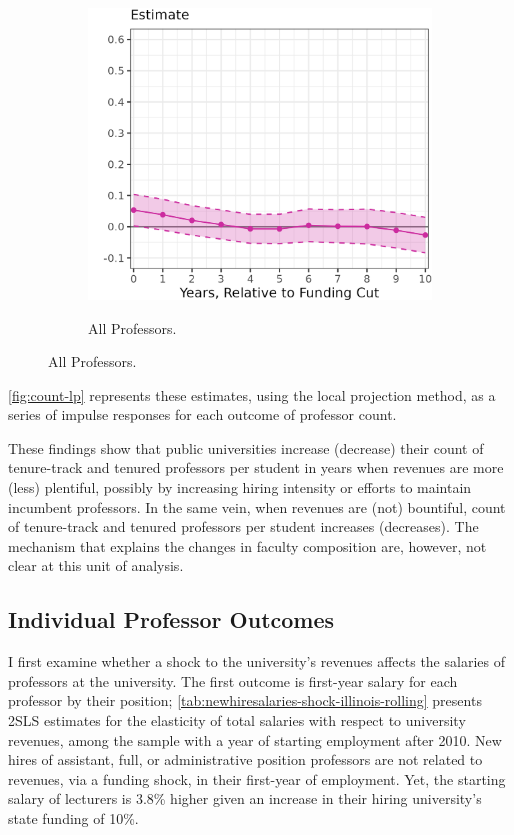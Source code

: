 \begin{figure}[h!]
\begin{subfigure}[b]{0.495\textwidth}
        \centering
        \caption{All Professors.}
        \includegraphics[width=\textwidth]{figures/all-count-lp.png}
        \label{fig:all-count-lp}
    \end{subfigure}
    \label{fig:count-lp}
\end{figure}
\autoref{fig:count-lp} represents these estimates, using the local projection method, as a series of impulse responses for each outcome of professor count.

These findings show that public universities increase (decrease) their count of tenure-track and tenured professors per student in years when revenues are more (less) plentiful, possibly by increasing hiring intensity or efforts to maintain incumbent professors.
In the same vein, when revenues are (not) bountiful, count of tenure-track and tenured professors per student increases (decreases).
The mechanism that explains the changes in faculty composition are, however, not clear at this unit of analysis.

\subsection{Individual Professor Outcomes}
\label{sec:results-indiv}

I first examine whether a shock to the university's revenues affects the salaries of professors at the university.
The first outcome is first-year salary for each professor by their position;
\autoref{tab:newhiresalaries-shock-illinois-rolling} presents 2SLS estimates for the elasticity of total salaries with respect to university revenues, among the sample with a year of starting employment after 2010.
New hires of assistant, full, or administrative position professors are not related to revenues, via a funding shock, in their first-year of employment.
Yet, the starting salary of lecturers is 3.8\% higher given an increase in their hiring university's state funding of 10\%.

